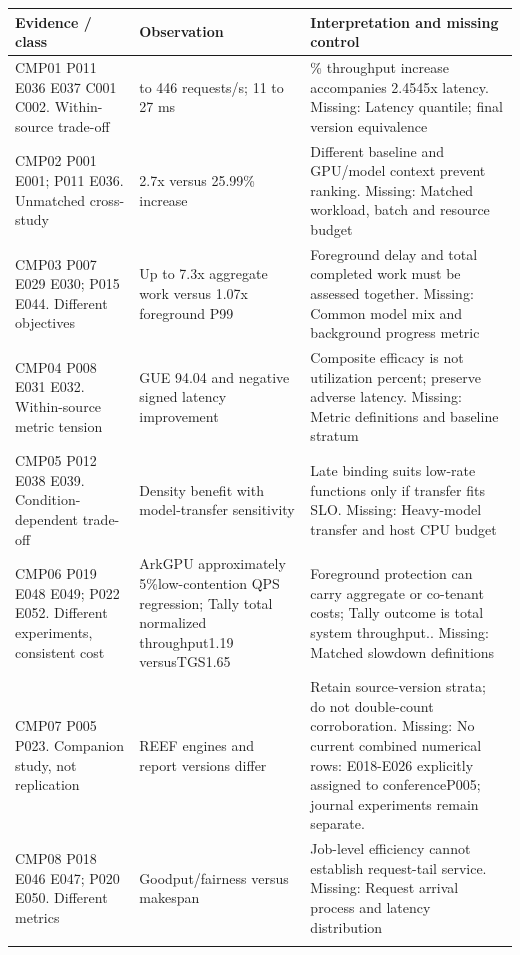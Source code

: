 \begin{longtable}{>{\raggedright\arraybackslash}p{}>{\raggedright\arraybackslash}p{}>{\raggedright\arraybackslash}p{}}
\toprule
\textbf{Evidence / class} & \textbf{Observation} & \textbf{Interpretation and missing control}\\\midrule\endhead
CMP01 P011 E036 E037 C001 C002. Within-source trade-off & 354 to 446 requests/s; 11 to 27 ms & 25.99\% throughput increase accompanies 2.4545x latency. Missing: Latency quantile; final version equivalence\\\addlinespace
CMP02 P001 E001; P011 E036. Unmatched cross-study & 2.7x versus 25.99\% increase & Different baseline and GPU/model context prevent ranking. Missing: Matched workload, batch and resource budget\\\addlinespace
CMP03 P007 E029 E030; P015 E044. Different objectives & Up to 7.3x aggregate work versus 1.07x foreground P99 & Foreground delay and total completed work must be assessed together. Missing: Common model mix and background progress metric\\\addlinespace
CMP04 P008 E031 E032. Within-source metric tension & GUE 94.04 and negative signed latency improvement & Composite efficacy is not utilization percent; preserve adverse latency. Missing: Metric definitions and baseline stratum\\\addlinespace
CMP05 P012 E038 E039. Condition-dependent trade-off & Density benefit with model-transfer sensitivity & Late binding suits low-rate functions only if transfer fits SLO. Missing: Heavy-model transfer and host CPU budget\\\addlinespace
CMP06 P019 E048 E049; P022 E052. Different experiments, consistent cost & ArkGPU approximately 5\%low-contention QPS regression; Tally total normalized throughput1.19 versusTGS1.65 & Foreground protection can carry aggregate or co-tenant costs; Tally outcome is total system throughput.. Missing: Matched slowdown definitions\\\addlinespace
CMP07 P005 P023. Companion study, not replication & REEF engines and report versions differ & Retain source-version strata; do not double-count corroboration. Missing: No current combined numerical rows: E018-E026 explicitly assigned to conferenceP005; journal experiments remain separate.\\\addlinespace
CMP08 P018 E046 E047; P020 E050. Different metrics & Goodput/fairness versus makespan & Job-level efficiency cannot establish request-tail service. Missing: Request arrival process and latency distribution\\\addlinespace
\bottomrule\end{longtable}